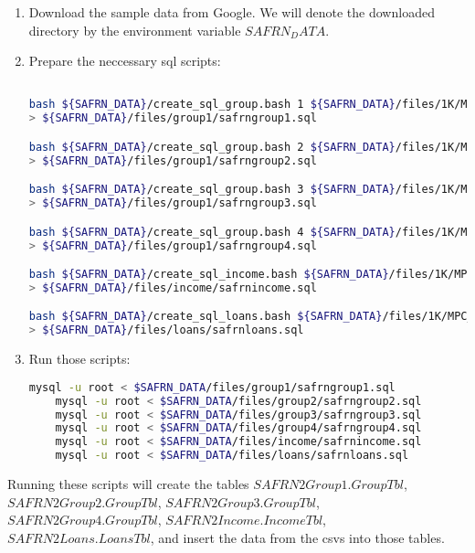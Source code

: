 \documentclass[12pt]{article}
\begin{document}
\begin{enumerate}




\item Download the sample data from Google. We will denote the
  downloaded directory by the environment variable $SAFRN_DATA$.
\item Prepare the neccessary sql scripts:
  \begin{lstlisting}[language=sh]

bash ${SAFRN_DATA}/create_sql_group.bash 1 ${SAFRN_DATA}/files/1K/MPC_Test5_1K_School1.csv \
> ${SAFRN_DATA}/files/group1/safrngroup1.sql

bash ${SAFRN_DATA}/create_sql_group.bash 2 ${SAFRN_DATA}/files/1K/MPC_Test5_1K_School2.csv \
> ${SAFRN_DATA}/files/group1/safrngroup2.sql

bash ${SAFRN_DATA}/create_sql_group.bash 3 ${SAFRN_DATA}/files/1K/MPC_Test5_1K_School3.csv \
> ${SAFRN_DATA}/files/group1/safrngroup3.sql

bash ${SAFRN_DATA}/create_sql_group.bash 4 ${SAFRN_DATA}/files/1K/MPC_Test5_1K_School4.csv \
> ${SAFRN_DATA}/files/group1/safrngroup4.sql

bash ${SAFRN_DATA}/create_sql_income.bash ${SAFRN_DATA}/files/1K/MPC_Test5_1K_income.csv \
> ${SAFRN_DATA}/files/income/safrnincome.sql

bash ${SAFRN_DATA}/create_sql_loans.bash ${SAFRN_DATA}/files/1K/MPC_Test5_1K_loans.csv \
> ${SAFRN_DATA}/files/loans/safrnloans.sql

\end{lstlisting}

\item Run those scripts:
  \begin{lstlisting}[language=sh]
    mysql -u root < $SAFRN_DATA/files/group1/safrngroup1.sql
    mysql -u root < $SAFRN_DATA/files/group2/safrngroup2.sql
    mysql -u root < $SAFRN_DATA/files/group3/safrngroup3.sql
    mysql -u root < $SAFRN_DATA/files/group4/safrngroup4.sql
    mysql -u root < $SAFRN_DATA/files/income/safrnincome.sql
    mysql -u root < $SAFRN_DATA/files/loans/safrnloans.sql
  \end{lstlisting}

\end{enumerate}
Running these scripts will create the tables $SAFRN2Group1.GroupTbl$,
$SAFRN2Group2.GroupTbl$, $SAFRN2Group3.GroupTbl$,
$SAFRN2Group4.GroupTbl$, $SAFRN2Income.IncomeTbl$,
$SAFRN2Loans.LoansTbl$, and insert the data from the csvs into those
tables.
\end{document}
